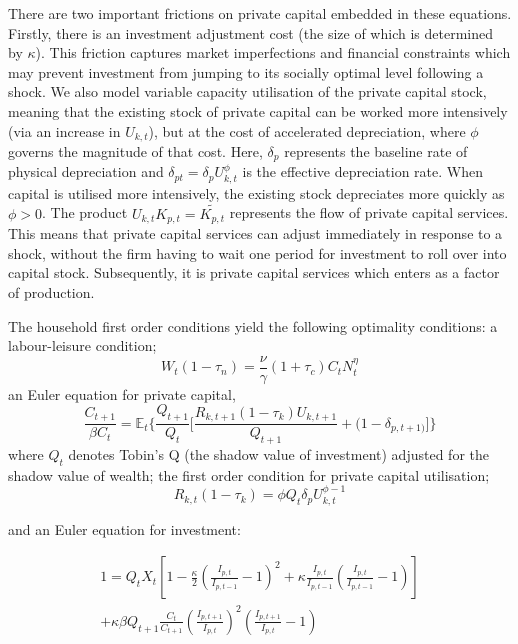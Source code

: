 \documentclass[titlepage, 11pt, a4paper]{article}
\renewcommand{\&}{and}
\begin{document}
\begin{appendices}
There are two important frictions on private capital embedded in these equations. Firstly, there is an investment adjustment cost (the size of which is determined by $\kappa$). This friction captures market imperfections and financial constraints which may prevent investment from jumping to its socially optimal level following a shock. We also model variable capacity utilisation of the private capital stock, meaning that the existing stock of private capital can be worked more intensively (via an increase in $U_{k,t}$), but at the cost of accelerated depreciation, where $\phi$ governs the magnitude of that cost. Here, $\delta_p$ represents the baseline rate of physical depreciation and $\delta_{pt} = \delta_{p}U_{k,t}^\phi$ is the effective depreciation rate. When capital is utilised more intensively, the existing stock depreciates more quickly as $\phi > 0$. The product $U_{k,t}K_{p,t} = \tilde{K_{p,t}}$ represents the flow of private capital services. This means that private capital services can adjust immediately in response to a shock, without the firm having to wait one period for investment to roll over into capital stock. Subsequently, it is private capital services which enters as a factor of production.\par

The household first order conditions yield the following optimality conditions: 
a labour-leisure condition;
\begin{equation} \label{labour-leisure}
   W_t(1-\tau_{n}) = \frac{\nu}{\gamma}(1+\tau_c)C_tN_t^\eta
\end{equation}
an Euler equation for private capital,
\begin{equation}\label{Euler_capital2}
    \frac{C_{t+1}}{\beta C_t} = \mathbb{E}_t \Big \{ \frac{Q_{t+1}}{Q_t} \Big[\frac{R_{k,t+1} (1-\tau_k) U_{k,t+1}}{Q_{t+1} }+ (1-\delta_{p,t+1)} \Big] \Big \}
\end{equation}
where $Q_t$ denotes Tobin's Q (the shadow value of investment) adjusted for the shadow value of wealth; 
the first order condition for private capital utilisation; 
\begin{equation} \label{Foc_uk}
    R_{k,t}(1-\tau_k) = \phi Q_t\delta_p U_{k,t}^{\phi-1}\end{equation}

and an Euler equation for investment:

\begin{multline}
1 = Q_t X_t\left[1 - \frac{\kappa}{2}\left(\frac{I_{p,t}}{I_{p,t-1}} - 1\right)^2 + \kappa\frac{I_{p,t}}{I_{p,t-1}}\left(\frac{I_{p,t}}{I_{p,t-1}} - 1\right)\right] \\
+ \kappa\beta Q_{t+1} \frac{C_t}{C_{t+1}} \left(\frac{I_{p,t+1}}{I_{p,t}}\right)^2\left(\frac{I_{p,t+1}}{I_{p,t}} - 1\right)
\end{multline}



\end{appendices}
\end{document}

